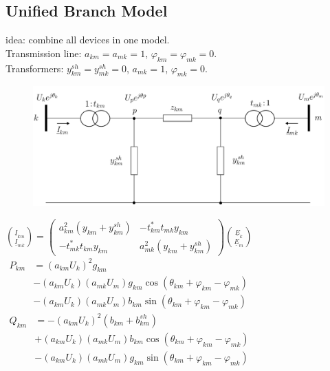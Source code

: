 \documentclass[a4paper,10pt,landscape]{scrartcl}
\begin{document}
\begin{multicols*}{3}
\subsection{Unified Branch Model}
idea: combine all devices in one model. \\
Transmission line: $a_{km}=a_{mk}=1$, $\varphi_{km}=\varphi_{mk}=0$. \\
Transformers: $y^{sh}_{km}=y^{sh}_{mk}=0$, $a_{mk}=1$, $\varphi_{mk}=0$.
\begin{figure}[H]
    \centering
    \includegraphics[width=1\linewidth]{src/ubm.png}
\end{figure}
$\binom{\underline{I}_{k m}}{\underline{I}_{m k}}=\left(\begin{array}{cc}a_{k m}^2\left(y_{k m}+y_{k m}^{s h}\right) & -t_{k m}^* t_{m k} y_{k m} \\ -t_{m k}^* t_{k m} y_{k m} & a_{m k}^2\left(y_{k m}+y_{k m}^{s h}\right)\end{array}\right)\binom{\underline{E}_k}{\underline{E}_m}$ \\
$\begin{aligned} P_{k m} & =\left(a_{k m} U_k\right)^2 g_{k m} \\ & -\left(a_{k m} U_k\right)\left(a_{m k} U_m\right) g_{k m} \cos \left(\theta_{k m}+\varphi_{k m}-\varphi_{m k}\right) \\ & -\left(a_{k m} U_k\right)\left(a_{m k} U_m\right) b_{k m} \sin \left(\theta_{k m}+\varphi_{k m}-\varphi_{m k}\right)\end{aligned}$ \\
$\begin{aligned} Q_{k m} & =-\left(a_{k m} U_k\right)^2\left(b_{k m}+b_{k m}^{s h}\right) \\ & +\left(a_{k m} U_k\right)\left(a_{m k} U_m\right) b_{k m} \cos \left(\theta_{k m}+\varphi_{k m}-\varphi_{m k}\right) \\ & -\left(a_{k m} U_k\right)\left(a_{m k} U_m\right) g_{k m} \sin \left(\theta_{k m}+\varphi_{k m}-\varphi_{m k}\right)\end{aligned}$



\end{multicols*}
\end{document}
